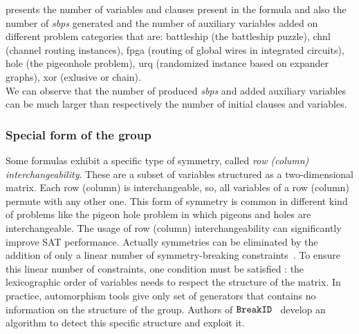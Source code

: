 


 presents the number of variables and clauses present in the formula and also the  
number of \textit{sbps} generated and the number of auxiliary variables added on different problem categories that are:
battleship (the battleship puzzle), chnl (channel routing instances), fpga (routing of global wires in integrated circuits),
 hole (the pigeonhole problem), urq (randomized instance based on expander graphs), xor (exlusive or chain).\\
We can observe that the number of produced \textit{sbps} and added auxiliary variables can be much larger than
respectively the number of initial clauses and variables.


%


\subsubsection{Special form of the group} \label{sec:matrix-sbp}

Some formulas exhibit a specific type of symmetry, called \emph{row (column) interchangeability}. These are
a subset of variables structured as a two-dimensional matrix. Each row (column) is interchangeable,
so, all variables of a row (column) permute with any other one.
This form of symmetry is common in different kind of problems like the pigeon hole problem in which
pigeons and holes are interchangeable. %
The usage of row (column) interchangeability can significantly improve SAT performance. 
Actually symmetries can be eliminated by the addition 
of only a linear number of symmetry-breaking constraints~\cite{flener2002breaking}. 
To ensure this linear number of constraints, one condition must be satisfied :
the lexicographic order of variables needs to respect the structure of the matrix.
In practice, automorphism tools give only  set of generators that contains no information on
the structure of the group. 
Authors of $\texttt{BreakID}$~\cite{devriendt2016improved} develop an algorithm to detect this specific 
structure and exploit it.

